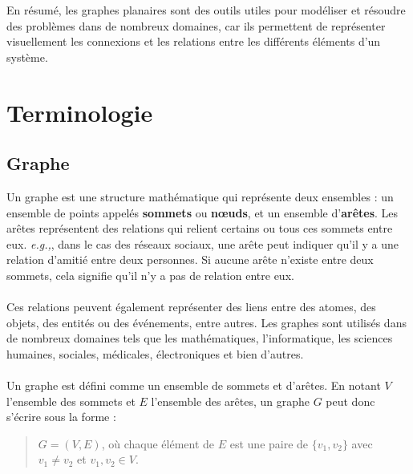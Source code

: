 \documentclass[hidelinks,letterpaper,12pt]{article}
\begin{document}
\bigbreak  
En résumé, les graphes planaires sont des outils utiles pour modéliser et résoudre des problèmes dans de nombreux domaines, car ils permettent de représenter visuellement les connexions et les relations entre les différents éléments d'un système.
\thispagestyle{empty}


\newpage
\section{Terminologie}
\subsection{Graphe}
\label{Graphe}
Un graphe est une structure mathématique qui représente deux ensembles : un ensemble de points appelés \textbf{sommets} ou \textbf{nœuds}, et un ensemble d'\textbf{arêtes}. Les arêtes représentent des relations qui relient certains ou tous ces sommets entre eux. \textit{e.g.,}, dans le cas des réseaux sociaux, une arête peut indiquer qu'il y a une relation d'amitié entre deux personnes. Si aucune arête n'existe entre deux sommets, cela signifie qu'il n'y a pas de relation entre eux.
\\ \\
Ces relations peuvent également représenter des liens entre des atomes, des objets, des entités ou des événements, entre autres. Les graphes sont utilisés dans de nombreux domaines tels que les mathématiques, l'informatique, les sciences humaines, sociales, médicales, électroniques et bien d'autres.
\\ \\
Un graphe est défini comme un ensemble de sommets et d'arêtes. En notant $V$ l'ensemble des sommets et $E$ l'ensemble des arêtes, un graphe $G$ peut donc s'écrire sous la forme :
\begin{quote}
\( G = (V, E) \), où chaque élément de $E$ est une paire de \( \{ v_1, v_2 \} \) avec \( v_1 \neq v_2 \) et \( v_1, v_2 \in V \).
\end{quote}

\end{document}
